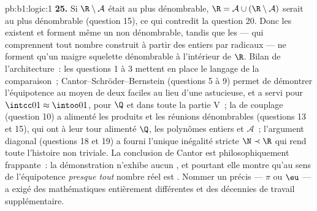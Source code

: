 \begin{solution}{pb:b1:logic:1}
\textbf{25.} Si $\R \setminus \mathcal{A}$ était au plus dénombrable,
$\R = \mathcal{A} \cup (\R \setminus \mathcal{A})$ serait au plus
dénombrable (question 15), ce qui contredit la question 20. Donc les
 existent et forment même un  non
dénombrable, tandis que les  --- qui comprennent
tout nombre construit à partir des entiers par radicaux --- ne forment
qu'un maigre squelette dénombrable à l'intérieur de $\R$. Bilan de
l'architecture~: les questions 1 à 3 mettent en place le langage de la
comparaison~; Cantor--Schröder--Bernstein (questions 5 à 9) permet de
démontrer l'équipotence au moyen de deux  faciles au lieu
d'une  astucieuse, et a servi pour $\intcc01 \approx
\intoo01$, pour $\Q$ et dans toute la partie V~; la  de
couplage (question 10) a alimenté les produits et les réunions
dénombrables (questions 13 et 15), qui ont à leur tour alimenté $\Q$,
les polynômes entiers et $\mathcal{A}$~; l'argument diagonal (questions
18 et 19) a fourni l'unique inégalité stricte $\N \prec \R$ qui rend
toute l'histoire non triviale. La conclusion de Cantor est
philosophiquement frappante~: la démonstration n'exhibe aucun , et pourtant elle montre qu'au sens de l'équipotence
\emph{presque tout} nombre réel est . Nommer un
 précis --- $\pi$ ou $\eu$ --- a exigé des mathématiques
entièrement différentes et des décennies de travail supplémentaire.
\end{solution}
